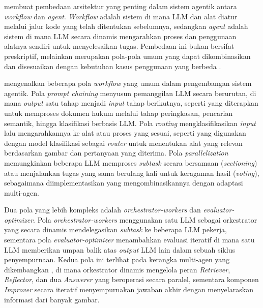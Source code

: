 \textcite{anthropicBuildingEffectiveAgents2024} membuat pembedaan arsitektur yang penting dalam sistem agentik antara \textit{workflow} dan \textit{agent}. \textit{Workflow} adalah sistem di mana LLM dan alat diatur melalui jalur kode yang telah ditentukan sebelumnya, sedangkan \textit{agent} adalah sistem di mana LLM secara dinamis mengarahkan proses dan penggunaan alatnya sendiri untuk menyelesaikan tugas. Pembedaan ini bukan bersifat preskriptif, melainkan merupakan pola-pola umum yang dapat dikombinasikan dan disesuaikan dengan kebutuhan kasus penggunaan yang berbeda \parencite{anthropicBuildingEffectiveAgents2024}.

\textcite{anthropicBuildingEffectiveAgents2024} mengenalkan beberapa pola \textit{workflow} yang umum dalam pengembangan sistem agentik. Pola \textit{prompt chaining} menyusun pemanggilan LLM secara berurutan, di mana \textit{output} satu tahap menjadi \textit{input} tahap berikutnya, seperti yang diterapkan \textcite{trautmannLargeLanguageModel2023} untuk memproses dokumen hukum melalui tahap peringkasan, pencarian semantik, hingga klasifikasi berbasis LLM. Pola \textit{routing} mengklasifikasikan \textit{input} lalu mengarahkannya ke alat atau proses yang sesuai, seperti yang digunakan \textcite{xuMultimodalAgriculturalAgent2025} dengan model klasifikasi sebagai \textit{router} untuk menentukan alat yang relevan berdasarkan gambar dan pertanyaan yang diterima. Pola \textit{parallelization} memungkinkan beberapa LLM memproses \textit{subtask} secara bersamaan (\textit{sectioning}) atau menjalankan tugas yang sama berulang kali untuk keragaman hasil (\textit{voting}), sebagaimana diimplementasikan \textcite{xiaParallelismMeetsAdaptiveness2025} yang mengombinasikannya dengan adaptasi multi-agen.

Dua pola yang lebih kompleks adalah \textit{orchestrator-workers} dan \textit{evaluator-optimizer}. Pola \textit{orchestrator-workers} menggunakan satu LLM sebagai orkestrator yang secara dinamis mendelegasikan \textit{subtask} ke beberapa LLM pekerja, sementara pola \textit{evaluator-optimizer} menambahkan evaluasi iteratif di mana satu LLM memberikan umpan balik atas \textit{output} LLM lain dalam sebuah siklus penyempurnaan. Kedua pola ini terlihat pada kerangka multi-agen yang dikembangkan \textcite{keDynamicOrchestrationMultiAgent2025}, di mana orkestrator dinamis mengelola peran \textit{Retriever}, \textit{Reflector}, dan dua \textit{Answerer} yang beroperasi secara paralel, sementara komponen \textit{Improver} secara iteratif menyempurnakan jawaban akhir dengan menyelaraskan informasi dari banyak gambar.

